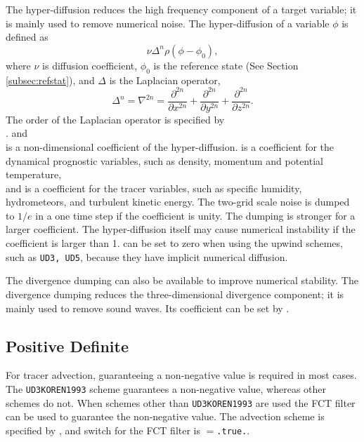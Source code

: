 The hyper-diffusion reduces the high frequency component of a target variable; it is mainly used to remove numerical noise.
The hyper-diffusion of a variable $\phi$ is defined as
\begin{equation}
  \nu \Delta^n \rho ( \phi - \phi_0 ),
\end{equation}
where $\nu$ is diffusion coefficient, $\phi_0$ is the reference state (See Section \ref{subsec:refstat}), and $\Delta$ is the Laplacian operator,
\begin{equation}
  \Delta^n = \nabla^{2n} = \frac{\partial^{2n}}{\partial x^{2n}} + \frac{\partial^{2n}}{\partial y^{2n}} + \frac{\partial^{2n}}{\partial z^{2n}}.
\end{equation}
The order of the Laplacian operator is specified by \\
. 
 and \\
 is a non-dimensional coefficient of the hyper-diffusion.
 is a coefficient for the dynamical prognostic variables, such as density, momentum and potential temperature, \\
and  is a coefficient for the tracer variables, such as specific humidity, hydrometeors, and turbulent kinetic energy.
The two-grid scale noise is dumped to $1/e$ in a one time step if the coefficient is unity.
The dumping is stronger for a larger coefficient.
The hyper-diffusion itself may cause numerical instability if the coefficient is larger than 1.
 can be set to zero when using the upwind schemes, such as \verb|UD3, UD5|, because they have implicit numerical diffusion.


The divergence dumping can also be available to improve numerical stability.
The divergence dumping reduces the three-dimensional divergence component; it is mainly used to remove sound waves.
Its coefficient can be set by .


\subsection{Positive Definite}

For tracer advection, guaranteeing a non-negative value is required in most cases.\\
The \verb|UD3KOREN1993| scheme guarantees a non-negative value, whereas other schemes do not.
When schemes other than \verb|UD3KOREN1993| are used the FCT filter can be used to guarantee the non-negative value.
The advection scheme is specified by , and switch for the FCT filter is $=$\verb|.true.|.


